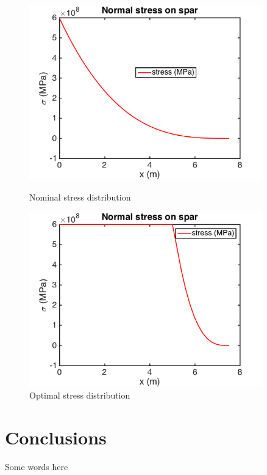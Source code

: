 \documentclass[11pt]{article}
\begin{document}
\begin{figure}[hbt]
\centering
\begin{minipage}[b]{0.4\textwidth}
\includegraphics[width=0.9\textwidth]{nominal_stress}
\caption{Nominal stress distribution}
\label{fig:nominal_stress}
\end{minipage}
\begin{minipage}[b]{0.4\textwidth}
\includegraphics[width=0.9\textwidth]{optimal_stress}
\caption{Optimal stress distribution}
\label{fig:optimal_stress}
\end{minipage}
\end{figure}

\section{Conclusions}

Some words here
\end{document}
